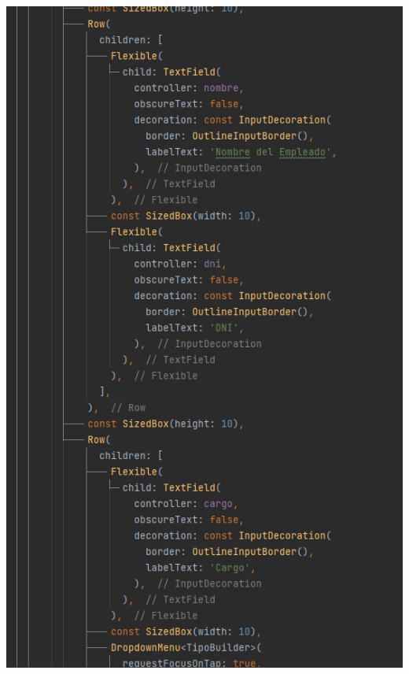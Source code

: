 \documentclass[
]{article}
\begin{document}
\includegraphics[width=5.6875in,height=9.47917in]{imagenes/main5.png}
\pagebreak
\end{document}
